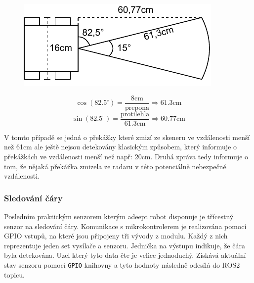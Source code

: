 \begin{figure}[h!]
	\centering
	\begin{minipage}[c]{0.5\textwidth}
		\centering
		\includegraphics[scale=1.0]{obrazky-figures/ultrasonic_blind_spot.pdf}
	\end{minipage}%
	\begin{minipage}[c]{0.5\textwidth}
			$$\cos(82.5^\circ) = \frac{8\text{cm}}{\text{prepona}} \Rightarrow 61.3\text{cm}$$
			$$\sin(82.5^\circ) = \frac{\text{protilehla}}{61.3\text{cm}} \Rightarrow 60.77\text{cm}$$
	\end{minipage}
	\caption{}
	\label{}
\end{figure}

V tomto případě se jedná o překážky které zmizí ze skeneru ve vzdálenosti menší než 61cm ale ještě nejsou detekovány klasickým způsobem, který informuje o překážkách ve vzdálenosti menší než např: 20cm. Druhá zpráva tedy informuje o tom, že nějaká překážka zmizela ze radaru v této potenciálně nebezpečné vzdálenosti.

\subsubsection*{Sledování čáry}
Posledním praktickým senzorem kterým adeept robot disponuje je třícestný senzor na sledování čáry. Komunikace s mikrokontrolerem je realizována pomocí GPIO vstupů, na které jsou připojeny tři vývody z modulu. Každý z nich reprezentuje jeden set vysílače a senzoru. Jednička na výstupu indikuje, že čára byla detekována. Uzel který tyto data čte je velice jednoduchý. Získává aktuální stav senzoru pomocí \verb|GPIO| knihovny a tyto hodnoty následně odesílá do ROS2 topicu.

